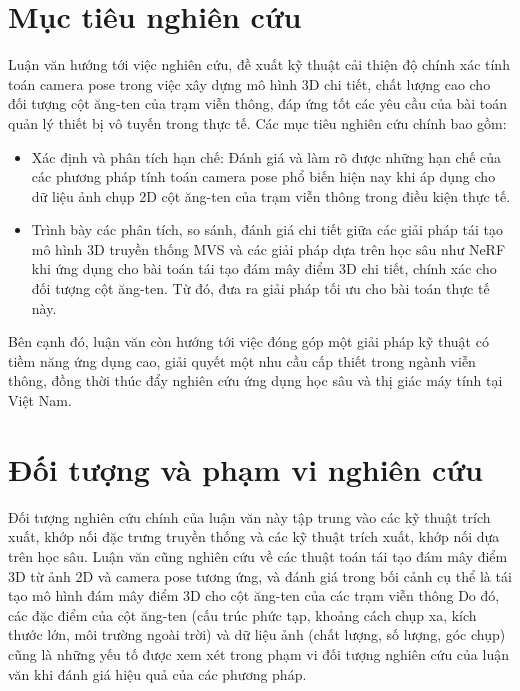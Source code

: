 \section{Mục tiêu nghiên cứu}
Luận văn hướng tới việc nghiên cứu, đề xuất kỹ thuật cải thiện độ chính xác tính toán camera pose trong việc xây dựng mô hình 3D chi tiết, chất lượng cao cho đối tượng cột ăng-ten của trạm viễn thông, đáp ứng tốt các yêu cầu của bài toán quản lý thiết bị vô tuyến trong thực tế. Các mục tiêu nghiên cứu chính bao gồm:
\begin{itemize}
    \item Xác định và phân tích hạn chế: Đánh giá và làm rõ được những hạn chế của các phương pháp tính toán camera pose phổ biến hiện nay khi áp dụng cho dữ liệu ảnh chụp 2D cột ăng-ten của trạm viễn thông trong điều kiện thực tế.

    \item Trình bày các phân tích, so sánh, đánh giá chi tiết giữa các giải pháp tái tạo mô hình 3D truyền thống MVS và các giải pháp dựa trên học sâu như NeRF khi ứng dụng cho bài toán tái tạo đám mây điểm 3D chi tiết, chính xác cho đối tượng cột ăng-ten. Từ đó, đưa ra giải pháp tối ưu cho bài toán thực tế này.
    
\end{itemize}
 
Bên cạnh đó, luận văn còn hướng tới việc đóng góp một giải pháp kỹ thuật có tiềm năng ứng dụng cao, giải quyết một nhu cầu cấp thiết trong ngành viễn thông, đồng thời thúc đẩy nghiên cứu ứng dụng học sâu và thị giác máy tính tại Việt Nam.

\section{Đối tượng và phạm vi nghiên cứu}
Đối tượng nghiên cứu chính của luận văn này tập trung vào các kỹ thuật trích xuất, khớp nối đặc trưng truyền thống và các kỹ thuật trích xuất, khớp nối dựa trên học sâu. Luận văn cũng nghiên cứu về các thuật toán tái tạo đám mây điểm 3D từ ảnh 2D và camera pose tương ứng, và đánh giá trong bối cảnh cụ thể là tái tạo mô hình đám mây điểm 3D cho cột ăng-ten của các trạm viễn thông Do đó, các đặc điểm của cột ăng-ten (cấu trúc phức tạp, khoảng cách chụp xa, kích thước lớn, môi trường ngoài trời) và dữ liệu ảnh (chất lượng, số lượng, góc chụp) cũng là những yếu tố được xem xét trong phạm vi đối tượng nghiên cứu của luận văn khi đánh giá hiệu quả của các phương pháp.

